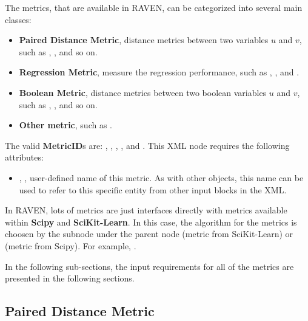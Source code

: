 The metrics, that are available in RAVEN, can be categorized into several main classes:
\begin{itemize}
  \item \textbf{Paired Distance Metric}, distance metrics between two variables $u$ and $v$, such as ,
    ,  and so on.
  \item \textbf{Regression Metric}, measure the regression performance, such as ,
    ,  and .
  \item \textbf{Boolean Metric}, distance metrics between two boolean variables $u$ and $v$, such as
    , ,  and so on.
  \item \textbf{Other metric}, such as .
\end{itemize}

The valid \textbf{MetricID}s are: , , , ,
and . This XML node requires the following attributes:
\begin{itemize}
  \item {}, , user-defined name of this metric. \nb As with other
    objects, this name can be used to refer to this specific entity from other input blocks in the XML.
\end{itemize}

In RAVEN, lots of metrics are just interfaces directly with metrics available within \textbf{Scipy} and
\textbf{SciKit-Learn}. In this case, the algorithm for the metrics is choosen by the subnode 
under the parent node  (metric from SciKit-Learn) or  (metric from Scipy). For
example, .

In the following sub-sections, the input requirements for all of the metrics are presented in the following sections.

\subsection{Paired Distance Metric}
\label{subsection:pairedDistance}

